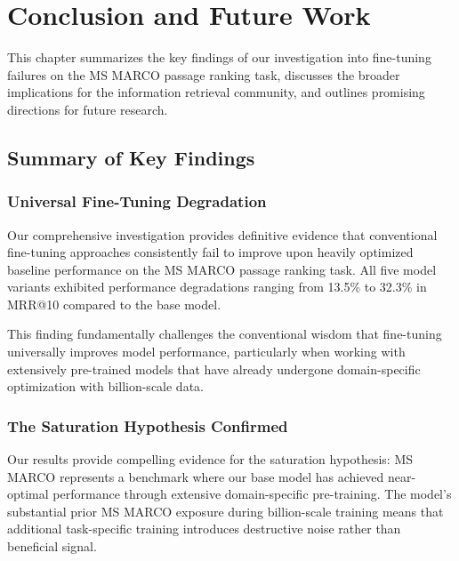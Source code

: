 
\chapter{Conclusion and Future Work} %

\label{Chapter6} %


This chapter summarizes the key findings of our investigation into fine-tuning failures on the MS MARCO passage ranking task, discusses the broader implications for the information retrieval community, and outlines promising directions for future research.

\section{Summary of Key Findings}

\subsection{Universal Fine-Tuning Degradation}

Our comprehensive investigation provides definitive evidence that conventional fine-tuning approaches consistently fail to improve upon heavily optimized baseline performance on the MS MARCO passage ranking task. All five model variants exhibited performance degradations ranging from 13.5\% to 32.3\% in MRR@10 compared to the base model.

This finding fundamentally challenges the conventional wisdom that fine-tuning universally improves model performance, particularly when working with extensively pre-trained models that have already undergone domain-specific optimization with billion-scale data.

\subsection{The Saturation Hypothesis Confirmed}

Our results provide compelling evidence for the saturation hypothesis: MS MARCO represents a benchmark where our base model has achieved near-optimal performance through extensive domain-specific pre-training. The model's substantial prior MS MARCO exposure during billion-scale training means that additional task-specific training introduces destructive noise rather than beneficial signal.

